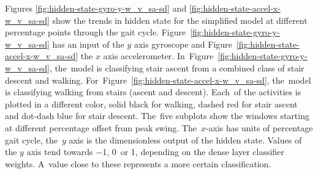 Figures \ref{fig:hidden-state-gyro-y-w_v_sa-sd} and \ref{fig:hidden-state-accel-x-w_v_sa-sd} show the trends in hidden state for the simplified model at different percentage points through the gait cycle. Figure~\ref{fig:hidden-state-gyro-y-w_v_sa-sd} has an input of the $y$ axis gyroscope and Figure~\ref{fig:hidden-state-accel-x-w_v_sa-sd} the $x$ axis accelerometer. In~Figure~\ref{fig:hidden-state-gyro-y-w_v_sa-sd}, the~model is classifying stair ascent from a combined class of stair descent and walking. For~Figure~\ref{fig:hidden-state-accel-x-w_v_sa-sd}, the~model is classifying walking from stairs (ascent and descent). Each~of the activities is plotted in a different color, solid black for walking, dashed red for stair ascent and dot-dash blue for stair descent. The~five subplots show the windows starting at different percentage offset from peak swing. The~$x$-axis has units of percentage gait cycle, the~$y$ axis is the dimensionless output of the hidden state. Values of the $y$ axis tend towards $-$1, 0~or 1, depending on the dense layer classifier weights. A~value close to these represents a more certain classification.


